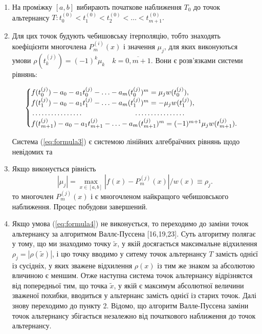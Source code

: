 \documentclass[ukrainian,14pt]{extarticle}
\begin{document}
\begin{enumerate}

\item
    На проміжку $[a, b]$ вибирають початкове наближення $T_0$ до точок альтернансу $T: t^{(0)}_{0} < t^{(0)}_{1} < t^{(0)}_{2} < \ldots < t^{(0)}_{m+1}.$
\item
    Для цих точок будують чебишовську ітерполяцію, тобто знаходять коефіцієнти многочлена $P^{(i)}_m(x)$ і значення $\mu_j$, для яких виконуються умови  $\rho(t^{(j)}_k) = (-1)^{k} \mu_k \quad k = \overline{0, m+1}$. Вони є розв'язками системи рівнянь:

\begin{equation}\label{eq:formula3}
\begin{cases}
f(t^{(j)}_0) - a_0 - a_1t^{(j)}_0 - \ldots - a_m(t_0^{(j)})^m=\mu_jw(t_0^{(j)}), \\
f(t^{(j)}_1)-a_0-a_1t^{(j)}_1 - \ldots - a_m(t^{(j)}_1)^m = - \mu_jw(t^{(j)}_1),\\
\dotfill\hfill\hbox{} \dotfill\hfill\hbox{}\\
f(t^{(j)}_{m+1}) -a_0 -a_1t^{(j)}_{m+1} - \ldots - a_m(t^{(j)}_{m+1})^m = (-1)^{m+1}\mu_jw(t^{(j)}_{m+1}).
\end{cases}
\end{equation}

Система (\ref{eq:formula3}) є системою   лінійних алгебраїчних рівнянь щодо невідомих   та  

\item
    Якщо виконується рівність
    \begin{equation}\label{eq:formula4}
        |\mu_j| = \max_{x \in [a,b]} |f(x) - P^{(j)}_m(x)| / w(x) \equiv \rho_j.
        \end{equation}
    то многочлен  $P^{(j)}_m(x)$ і є многочленом найкращого чебишовського наближення. Процес побудови завершений.
\item
    Якщо умова (\ref{eq:formula4}) не виконується, то переходимо до заміни точок альтернансу за алгоритмом Валлє-Пуссена [16,19,23]. Суть алгоритму полягає у тому, що ми знаходимо точку $\tilde{x}$, у якій досягається максимальне відхилення $\rho_j = |\rho(\tilde{x})|$, і цю точку   вводимо у ситему точок альтернансу $T$ замість однієї із сусідніх, у яких зважене відхилення $\rho(x)$ із тим же знаком за абсолютою вличиною є меншим. Отже наступна система точок альтернансу відрізняєтся від попередньої тим, що точка $\tilde{x}$, у якій є максимум абсолютної величини зваженої похибки, вводиться у альтернанс замість однієї із старих точок. Далі знову переходимо до пункту 2. Відомо, що алгоритм Валле-Пуссена заміни точок альтернансу збігається незалежно від початкового наближення до точок альтернансу. 

\end{enumerate}
\end{document}
